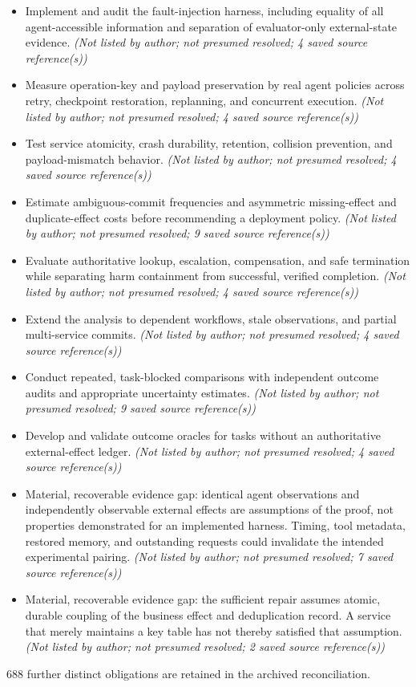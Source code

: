 \documentclass[11pt]{article}
\begin{document}
\begin{itemize}
\item Implement and audit the fault-injection harness, including equality of all agent-accessible information and separation of evaluator-only external-state evidence. \textit{ (Not listed by author; not presumed resolved; 4 saved source reference(s))}
\item Measure operation-key and payload preservation by real agent policies across retry, checkpoint restoration, replanning, and concurrent execution. \textit{ (Not listed by author; not presumed resolved; 4 saved source reference(s))}
\item Test service atomicity, crash durability, retention, collision prevention, and payload-mismatch behavior. \textit{ (Not listed by author; not presumed resolved; 4 saved source reference(s))}
\item Estimate ambiguous-commit frequencies and asymmetric missing-effect and duplicate-effect costs before recommending a deployment policy. \textit{ (Not listed by author; not presumed resolved; 9 saved source reference(s))}
\item Evaluate authoritative lookup, escalation, compensation, and safe termination while separating harm containment from successful, verified completion. \textit{ (Not listed by author; not presumed resolved; 4 saved source reference(s))}
\item Extend the analysis to dependent workflows, stale observations, and partial multi-service commits. \textit{ (Not listed by author; not presumed resolved; 4 saved source reference(s))}
\item Conduct repeated, task-blocked comparisons with independent outcome audits and appropriate uncertainty estimates. \textit{ (Not listed by author; not presumed resolved; 9 saved source reference(s))}
\item Develop and validate outcome oracles for tasks without an authoritative external-effect ledger. \textit{ (Not listed by author; not presumed resolved; 4 saved source reference(s))}
\item Material, recoverable evidence gap: identical agent observations and independently observable external effects are assumptions of the proof, not properties demonstrated for an implemented harness. Timing, tool metadata, restored memory, and outstanding requests could invalidate the intended experimental pairing. \textit{ (Not listed by author; not presumed resolved; 7 saved source reference(s))}
\item Material, recoverable evidence gap: the sufficient repair assumes atomic, durable coupling of the business effect and deduplication record. A service that merely maintains a key table has not thereby satisfied that assumption. \textit{ (Not listed by author; not presumed resolved; 2 saved source reference(s))}
\end{itemize}
688 further distinct obligations are retained in the archived reconciliation.
\end{document}
